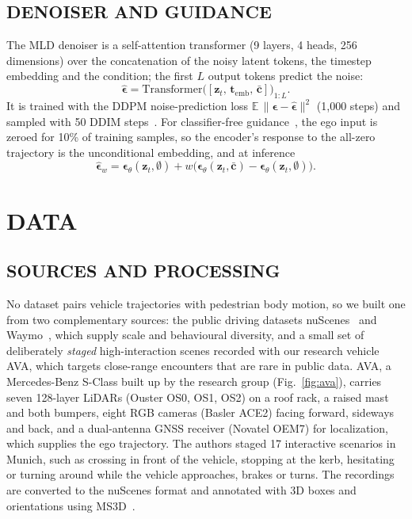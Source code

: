 \documentclass{ieeeoj}
\begin{document}
\subsection{DENOISER AND GUIDANCE}

The MLD denoiser is a self-attention transformer (9 layers, 4 heads, 256 dimensions) over the concatenation of the noisy latent tokens, the timestep embedding and the condition; the first $L$ output tokens predict the noise:
\begin{equation}
  \hat{\boldsymbol{\epsilon}} = \mathrm{Transformer}\bigl([\mathbf{z}_t,\, \mathbf{t}_{\mathrm{emb}},\, \bar{\mathbf{c}}]\bigr)_{1:L}.
\end{equation}
It is trained with the DDPM noise-prediction loss $\mathbb{E}\,\|\boldsymbol{\epsilon} - \hat{\boldsymbol{\epsilon}}\|^2$ (1{,}000 steps) and sampled with 50 DDIM steps~\cite{song2021ddim}.
For classifier-free guidance~\cite{ho2022cfg}, the ego input is zeroed for 10\% of training samples, so the encoder's response to the all-zero trajectory is the unconditional embedding, and at inference
\begin{equation}
  \hat{\boldsymbol{\epsilon}}_w = \boldsymbol{\epsilon}_\theta(\mathbf{z}_t, \emptyset) + w \bigl(\boldsymbol{\epsilon}_\theta(\mathbf{z}_t, \bar{\mathbf{c}}) - \boldsymbol{\epsilon}_\theta(\mathbf{z}_t, \emptyset)\bigr).
\end{equation}

\section{DATA}
\label{sec:data}

\subsection{SOURCES AND PROCESSING}

No dataset pairs vehicle trajectories with pedestrian body motion, so we built one from two complementary sources: the public driving datasets nuScenes~\cite{caesar2020nuscenes} and Waymo~\cite{sun2020waymo}, which supply scale and behavioural diversity, and a small set of deliberately \emph{staged} high-interaction scenes recorded with our research vehicle AVA, which targets close-range encounters that are rare in public data.
AVA, a Mercedes-Benz S-Class built up by the research group (Fig.~\ref{fig:ava}), carries seven 128-layer LiDARs (Ouster OS0, OS1, OS2) on a roof rack, a raised mast and both bumpers, eight RGB cameras (Basler ACE2) facing forward, sideways and back, and a dual-antenna GNSS receiver (Novatel OEM7) for localization, which supplies the ego trajectory.
The authors staged 17 interactive scenarios in Munich, such as crossing in front of the vehicle, stopping at the kerb, hesitating or turning around while the vehicle approaches, brakes or turns.
The recordings are converted to the nuScenes format and annotated with 3D boxes and orientations using MS3D~\cite{tsai2024ms3d++,tsai2023ms3d}.
\end{document}
